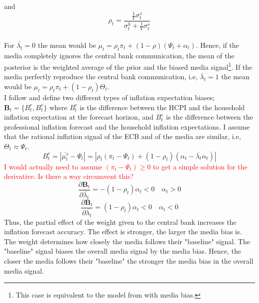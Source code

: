 \documentclass[review]{elsarticle}
\begin{document}
and
\begin{equation}
\rho_t = \frac{\frac{1}{V}\sigma^s_t}{{\sigma^h_t + \frac{1}{V}}\sigma^s_t}
\end{equation}
\\
For $\bar{\lambda_t} = 0$ the mean would be $\mu_t = \rho_t \pi_t + (1- \rho) (\Psi_t +\alpha_t)$. Hence, if the media completely ignores the central bank communication, the mean of the posterior is the weighted average of the prior and the biased media signal\footnote{This case is equivalent to the model from \cite{LamlaLein2014} with media bias.}. If the media perfectly reproduce the central bank communication, i.e, $\bar{\lambda_t} = 1$ the mean would be $\mu_t = \rho_t \pi_t + (1-\rho_t) \Theta_t$. 
\\
I follow \cite{Ehrmann2017} and define two different types of inflation expectation biases; $\mathbf{B}_t = \{B^r_t, B^e_t \}$ where $B^r_t$ is the difference between the HCPI and the household inflation expectation at the forecast horizon, and $B^e_t$ is the difference between the professional inflation forecast and the household inflation expectations. I assume that the rational inflation signal of the ECB and of the media are similar, i.e, $\Theta_t \approx \Psi_t$.
\begin{equation}
B^e_t = |\bar{\mu^s_t} - \Psi_t| = |\rho_t (\pi_t - \Psi_t) + (1-\rho_t)(\alpha_t - \bar{\lambda_t} \alpha_t)|
\end{equation}
\textcolor{red}{I would actually need to assume $(\pi_t - \Psi_t) \geq 0$ to get a simple solution for the derivative. Is there a way circumvent this?}
\begin{equation}
\frac{\partial \mathbf{B}_t}{\partial \bar{\lambda_t}} = -(1-\rho_t)\alpha_t < 0 \quad \alpha_t > 0
\end{equation}
\begin{equation}
\frac{\partial \mathbf{B}_t}{\partial \bar{\lambda_t}} = (1-\rho_t)\alpha_t < 0 \quad \alpha_t < 0
\end{equation}
Thus, the partial effect of the weight given to the central bank increases the inflation forecast accuracy. The effect is stronger, the larger the media bias is. The weight determines how closely the media follows their "baseline" signal. The "baseline" signal biases the overall media signal by the media bias. Hence, the closer the media follows their "baseline" the stronger the media bias in the overall media signal. 
\end{document}
